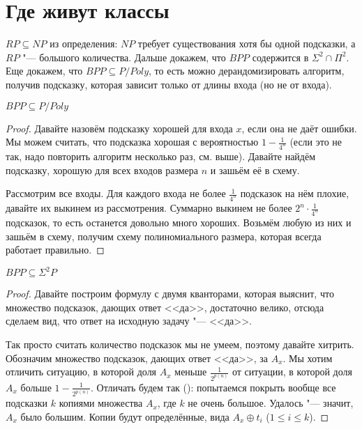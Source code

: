 \section{Где живут классы}
$RP \subseteq NP$ из определения: $NP$ требует существования хотя бы одной подсказки, а $RP$ "--- большого количества.
Дальше докажем, что $BPP$ содержится в $\Sigma^2 \cap \Pi^2$.
Еще докажем, что $BPP \subseteq P/Poly$, то есть можно дерандомизировать алгоритм, получив
подсказку, которая зависит только от длины входа (но не от входа).

\begin{theorem}
	$BPP \subseteq P/Poly$
\end{theorem}
\begin{proof}
	Давайте назовём подсказку хорошей для входа $x$, если она не даёт ошибки.
	Мы можем считать, что подсказка хорошая с вероятностью $1 - \frac{1}{4^n}$
	(если это не так, надо повторить алгоритм несколько раз, см. выше).
	Давайте найдём подсказку, хорошую для всех входов размера $n$ и зашьём её в схему.

	Рассмотрим все входы.
	Для каждого входа не более $\frac{1}{4^n}$ подсказок на нём плохие, давайте их выкинем из рассмотрения.
	Суммарно выкинем не более $2^n \cdot \frac{1}{4^n}$ подсказок, то есть останется довольно много хороших.
	Возьмём любую из них и зашьём в схему, получим схему полиномиального размера, которая всегда
	работает правильно.
\end{proof}

\begin{theorem}
	$BPP \subseteq \Sigma^2P$
\end{theorem}
\begin{proof}
	Давайте построим формулу с двумя кванторами, которая выяснит, что множество подсказок, дающих
	ответ <<да>>, достаточно велико, отсюда сделаем вид, что ответ на исходную задачу "--- <<да>>.
	
	Так просто считать количество подсказок мы не умеем, поэтому давайте хитрить.
	Обозначим множество подсказок, дающих ответ <<да>>, за $A_x$.
	Мы хотим отличить ситуацию, в которой доля $A_x$ меньше $\frac{1}{2^{p(n)}}$ от ситуации,
	в которой доля $A_x$ больше $1-\frac{1}{2^{p(n)}}$.
	Отличать будем так (\TODO): попытаемся покрыть вообще все подсказки $k$ копиями множества $A_x$,
	где $k$ не очень большое.
	Удалось "--- значит, $A_x$ было большим.
	Копии будут определённые, вида $A_x \oplus t_i$ ($1 \le i \le k$).
\end{proof}
